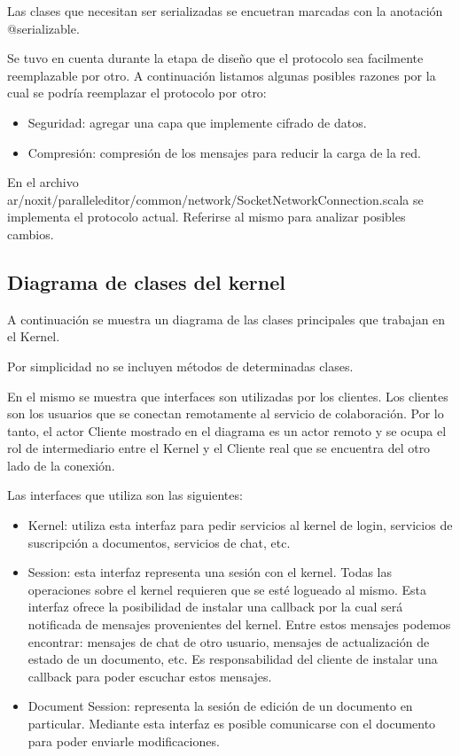 \documentclass[12pt,a4paper]{article}
\begin{document}
Las clases que necesitan ser serializadas se encuetran marcadas con la anotación @serializable.

Se tuvo en cuenta durante la etapa de diseño que el protocolo sea facilmente reemplazable por otro. A continuación listamos
algunas posibles razones por la cual se podría reemplazar el protocolo por otro:

\begin{itemize}
	\item Seguridad: agregar una capa que implemente cifrado de datos.
	\item Compresión: compresión de los mensajes para reducir la carga de la red.
\end{itemize}

En el archivo ar/noxit/paralleleditor/common/network/SocketNetworkConnection.scala se implementa el protocolo actual. Referirse
al mismo para analizar posibles cambios.

\subsection{Diagrama de clases del kernel}
A continuación se muestra un diagrama de las clases principales que trabajan en el Kernel.


Por simplicidad no se incluyen métodos de determinadas clases.

En el mismo se muestra que interfaces son utilizadas por los clientes. Los clientes son los usuarios que se conectan
remotamente al servicio de colaboración. Por lo tanto, el actor Cliente mostrado en el diagrama es un actor remoto y se
ocupa el rol de intermediario entre el Kernel y el Cliente real que se encuentra del otro lado de la conexión.

Las interfaces que utiliza son las siguientes:
\begin{itemize}
	\item Kernel: utiliza esta interfaz para pedir servicios al kernel de login, servicios de suscripción a documentos,
	servicios de chat, etc.

	\item Session: esta interfaz representa una sesión con el kernel. Todas las operaciones sobre el kernel requieren que se
	esté logueado al mismo. Esta interfaz ofrece la posibilidad de instalar una callback por la cual será notificada de mensajes
	provenientes del kernel. Entre estos mensajes podemos encontrar: mensajes de chat de otro usuario, mensajes de actualización
	de estado de un documento, etc. Es responsabilidad del cliente de instalar una callback para poder escuchar estos mensajes.

	\item Document Session: representa la sesión de edición de un documento en particular. Mediante esta interfaz es posible
	comunicarse con el documento para poder enviarle modificaciones.
\end{itemize}
\end{document}
